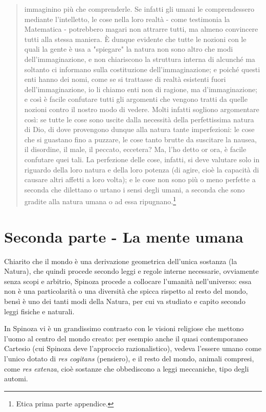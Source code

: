 \begin{quotation}
	immaginino più che comprenderle. Se infatti gli umani le comprendessero mediante l’intelletto, le cose nella loro realtà - come testimonia la Matematica - potrebbero magari non
	attrarre tutti, ma almeno convincere tutti alla stessa maniera.
	È dunque evidente che tutte le nozioni con le quali la gente è usa a "spiegare" la natura
	non sono altro che modi dell’immaginazione, e non chiariscono la struttura interna di alcunché ma soltanto ci informano sulla costituzione dell’immaginazione; e poiché questi enti hanno dei nomi, come se si trattasse di realtà esistenti fuori dell’immaginazione, io li chiamo enti non di ragione, ma d’immaginazione; e così è facile confutare tutti gli argomenti che vengono tratti da quelle nozioni contro il nostro modo di vedere. Molti infatti sogliono argomentare così: se tutte le cose sono uscite dalla necessità della perfettissima natura di Dio, di dove provengono dunque alla natura tante imperfezioni: le cose che si guastano fino a puzzare, le cose tanto brutte da suscitare la nausea, il disordine, il male, il peccato, eccetera? Ma, l’ho detto or ora, è facile confutare quei tali. La perfezione delle cose,
	infatti, si deve valutare solo in riguardo della loro natura e della loro potenza (di agire, cioè la capacità  di causare altri affetti a loro volta); e le cose non
	sono più o meno perfette a seconda che dilettano o urtano i sensi degli umani, a seconda
	che sono gradite alla natura umana o ad essa ripugnano.\footnote{Etica prima parte appendice.}
	
\end{quotation}
\newpage
\section{Seconda parte - La mente umana}
Chiarito che il mondo è una derivazione geometrica dell'unica sostanza (la Natura), che quindi procede secondo leggi e regole interne necessarie, ovviamente senza scopi e arbitrio, Spinoza procede a collocare l'umanità nell'universo: essa non è una particolarità o una diversità che spicca rispetto al resto del mondo, bensì è uno dei tanti modi della Natura, per cui va studiato e capito secondo leggi fisiche e naturali.

In Spinoza vi è un grandissimo contrasto con le visioni religiose che mettono l'uomo al centro del mondo creato: per esempio anche il quasi contemporaneo Cartesio (cui Spinoza deve l'approccio razionalistico), vedeva l'essere umano come l'unico dotato di \textit{res cogitans} (pensiero), e il resto del mondo, animali compresi, come \textit{res extenza}, cioè sostanze che obbediscono a leggi meccaniche, tipo degli automi.


